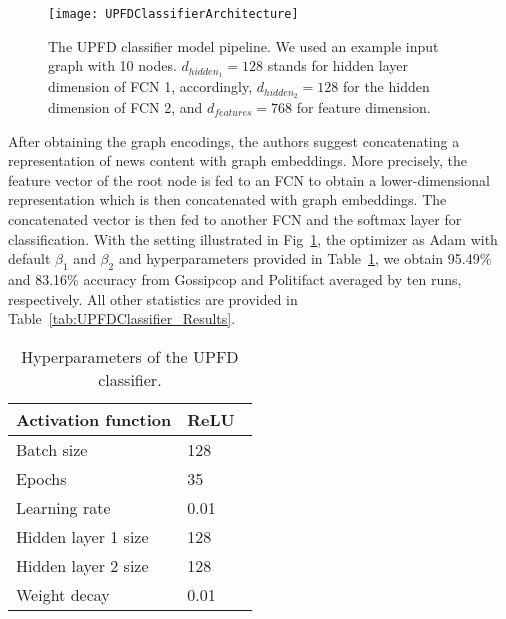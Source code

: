 \begin{figure}
    \centering
    \texttt{[image: UPFDClassifierArchitecture]}
    \caption[The UPFD classifier model pipeline]{The UPFD classifier model pipeline. We used an example input graph with 10 nodes. $d_{hidden_1} = 128$ stands for hidden layer dimension of FCN 1, accordingly, $d_{hidden_2} = 128$ for the hidden dimension of FCN 2, and $d_{features} = 768$ for feature dimension.}
    \label{fig:UPFDClassifierArchitecture}
\end{figure}
After obtaining the graph encodings, the authors suggest concatenating a representation of news content with graph embeddings. More precisely, the feature vector of the root node is fed to an FCN to obtain a lower-dimensional representation which is then concatenated with graph embeddings. The concatenated vector is then fed to another FCN and the softmax layer for classification. With the setting illustrated in Fig~\ref{fig:UPFDClassifierArchitecture}, the optimizer as Adam with default $\beta_1$ and $\beta_2$ and hyperparameters provided in Table~\ref{tab:UPFDClassifier_Hyperparameters}, we obtain 95.49\% and 83.16\% accuracy from Gossipcop and Politifact averaged by ten runs, respectively. All other statistics are provided in Table~\ref{tab:UPFDClassifier_Results}.\\
\begin{table}
    \centering
    \begin{tabular}{|l|l|}
        \hline
        Activation function & ReLU~\parencite{ReLU_Nair} \\
        \hline
        Batch size          & 128                        \\
        \hline
        Epochs              & 35                         \\
        \hline
        Learning rate       & 0.01                       \\
        \hline
        Hidden layer 1 size & 128                        \\
        \hline
        Hidden layer 2 size & 128                        \\
        \hline
        Weight decay        & 0.01                       \\
        \hline
    \end{tabular}
    \caption[Hyperparameters of the UPFD classifier.]{Hyperparameters of the UPFD classifier.}
    \label{tab:UPFDClassifier_Hyperparameters}
\end{table}
